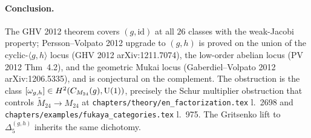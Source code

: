 \paragraph{Conclusion.}
The GHV 2012 theorem covers $(g,\mathrm{id})$ at all $26$ classes
with the weak-Jacobi property; Persson--Volpato 2012 upgrade to
$(g,h)$ is proved on the union of the cyclic-$\langle g,h\rangle$
locus (GHV 2012 arXiv:1211.7074), the low-order abelian locus
(PV 2012 Thm~4.2), and the geometric Mukai locus (Gaberdiel--Volpato
2012 arXiv:1206.5335), and is conjectural on the complement.  The
obstruction is the class
$[\omega_{g,h}]\in H^2(C_{M_{24}}(g),\mathrm{U}(1))$, precisely the Schur
multiplier obstruction that controls
$\widetilde{M}_{24}\to M_{24}$ at
\texttt{chapters/theory/en\_factorization.tex} l.~2698 and
\texttt{chapters/examples/fukaya\_categories.tex} l.~975.  The
Gritsenko lift to $\Delta_5^{(g,h)}$ inherits the same dichotomy.
